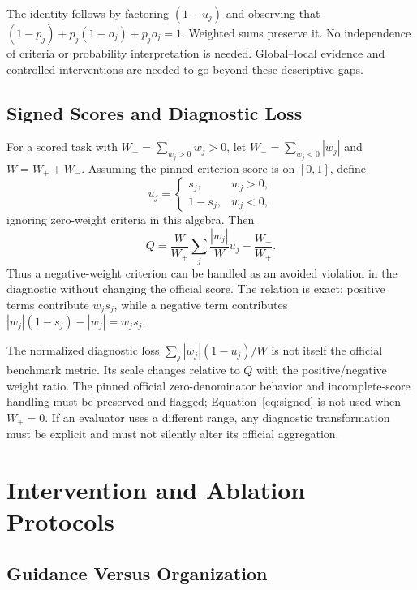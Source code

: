 The identity follows by factoring $(1-u_j)$ and observing that $(1-p_j)+p_j(1-o_j)+p_jo_j=1$. Weighted sums preserve it. No independence of criteria or probability interpretation is needed. Global--local evidence and controlled interventions are needed to go beyond these descriptive gaps.

\subsection{Signed Scores and Diagnostic Loss}

For a scored task with $W_+=\sum_{w_j>0}w_j>0$, let $W_-=\sum_{w_j<0}|w_j|$ and $W=W_++W_-$. Assuming the pinned criterion score is on $[0,1]$, define
\begin{equation}
u_j=\begin{cases}s_j,&w_j>0,\\1-s_j,&w_j<0,\end{cases}
\end{equation}
ignoring zero-weight criteria in this algebra. Then
\begin{equation}
Q=\frac{W}{W_+}\sum_j\frac{|w_j|}{W}u_j-\frac{W_-}{W_+}.
\label{eq:signed}
\end{equation}
Thus a negative-weight criterion can be handled as an avoided violation in the diagnostic without changing the official score. The relation is exact: positive terms contribute $w_js_j$, while a negative term contributes $|w_j|(1-s_j)-|w_j|=w_js_j$.

The normalized diagnostic loss $\sum_j|w_j|(1-u_j)/W$ is not itself the official benchmark metric. Its scale changes relative to $Q$ with the positive/negative weight ratio. The pinned official zero-denominator behavior and incomplete-score handling must be preserved and flagged; Equation~\ref{eq:signed} is not used when $W_+=0$. If an evaluator uses a different range, any diagnostic transformation must be explicit and must not silently alter its official aggregation.

\section{Intervention and Ablation Protocols}
\label{app:interventions}

\subsection{Guidance Versus Organization}
\label{app:ggo}

